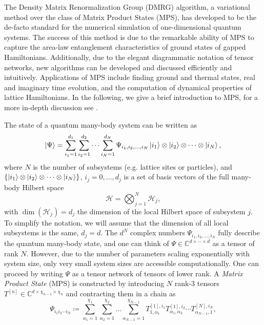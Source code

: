 The Density Matrix Renormalization Group (DMRG) algorithm, a variational method over the class of Matrix Product States (MPS), has developed to be the de-facto standard for the numerical simulation of one-dimensional quantum systems. The success of this method is due to the remarkable ability of MPS to capture the area-law entanglement characteristics of ground states of gapped Hamiltonians. Additionally, due to the elegant diagrammatic notation of tensor networks, new algorithms can be developed and discussed efficiently and intuitively. Applications of MPS include finding ground and thermal states, real and imaginary time evolution, and the computation of dynamical properties of lattice Hamiltonians. In the following, we give a brief introduction to MPS, for a more in-depth discussion see \cite{cite:DMRG_in_the_age_of_MPS, cite:practical_introduction_MPS_and_PEPS, cite:tenpy}. \par
The state of a quantum many-body system can be written as
\begin{equation}
	\ket{\Psi} = \sum_{i_1=1}^{d_1} \sum_{i_2=1}^{d_2} \cdots \sum_{i_N=1}^{d_N} \Psi_{i_1,i_2,\dots,i_N} \ket{i_1} \otimes \ket{i_2} \otimes \cdots \otimes \ket{i_N},
\end{equation}
where $N$ is the number of subsystems (e.g. lattice sites or particles), and $\left\{\ket{i_1} \otimes \ket{i_2} \otimes \dots \otimes \ket{i_N}\right\}$, $i_j = 0, \dots, d_j$ is a set of basis vectors of the full many-body Hilbert space
\begin{equation}
	\mathcal{H} = \bigotimes_{j=1}^{N} \mathcal{H}_j,
\end{equation}
with $\dim\left(\mathcal{H}_j\right) = d_j$ the dimension of the local Hilbert space of subsystem $j$. To simplify the notation, we will assume that the dimension of all local subsystems is the same, $d_j = d$. The $d^N$ complex numbers $\Psi_{i_1,i_2,\dots,i_N}$ fully describe the quantum many-body state, and one can think of $\Psi\in\mathbb{C}^{d\times\cdots\times d}$ as a tensor of rank $N$. However, due to the number of parameters scaling exponentially with system size, only very small system sizes are accessible computationally. One can proceed by writing $\Psi$ as a tensor network of tensors of lower rank. A \textit{Matrix Product State} (MPS) is constructed by introducing $N$ rank-3 tensors $T^{[n]}\in\mathbb{C}^{d\times \chi_{n-1}\times \chi_{n}}$ and contracting them in a chain as
\begin{equation}
	\label{eq:MPS_open_boundary_conditions_general_definition}
	\Psi_{i_1i_2\cdots i_N} \coloneqq \sum_{\alpha_1=1}^{\chi_1} \sum_{\alpha_2=1}^{\chi_2}\dots\sum_{\alpha_{N-1}=1}^{\chi_{N-1}}T^{[1],i_1}_{1,\alpha_1} T^{[1],i_2}_{\alpha_1,\alpha_2} \cdots T^{[N],i_N}_{\alpha_{N-1},1},
\end{equation}

